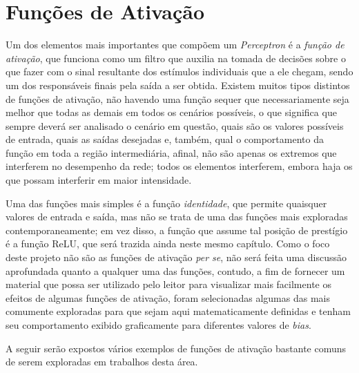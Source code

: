 \pagebreak
\newpage

\section{Funções de Ativação}
\label{sec:ann_activation_functions}

Um dos elementos mais importantes que compõem um \textit{Perceptron} é a \textit{função de ativação}, que funciona como um filtro que auxilia na tomada de decisões sobre o que fazer com o sinal resultante dos estímulos individuais que a ele chegam, sendo um dos responsáveis finais pela saída a ser obtida. Existem muitos tipos distintos de funções de ativação, não havendo uma função sequer que necessariamente seja melhor que todas as demais em todos os cenários possíveis, o que significa que sempre deverá ser analisado o cenário em questão, quais são os valores possíveis de entrada, quais as saídas desejadas e, também, qual o comportamento da função em toda a região intermediária, afinal, não são apenas os extremos que interferem no desempenho da rede; todos os elementos interferem, embora haja os que possam interferir em maior intensidade.

Uma das funções mais simples é a função \textit{identidade}, que permite quaisquer valores de entrada e saída, mas não se trata de uma das funções mais exploradas contemporaneamente; em vez disso, a função que assume tal posição de prestígio é a função ReLU, que será trazida ainda neste mesmo capítulo. Como o foco deste projeto não são as funções de ativação \textit{per se}, não será feita uma discussão aprofundada quanto a qualquer uma das funções, contudo, a fim de fornecer um material que possa ser utilizado pelo leitor para visualizar mais facilmente os efeitos de algumas funções de ativação, foram selecionadas algumas das mais comumente exploradas para que sejam aqui matematicamente definidas e tenham seu comportamento exibido graficamente para diferentes valores de \textit{bias}.

A seguir serão expostos vários exemplos de funções de ativação bastante comuns de serem exploradas em trabalhos desta área.


